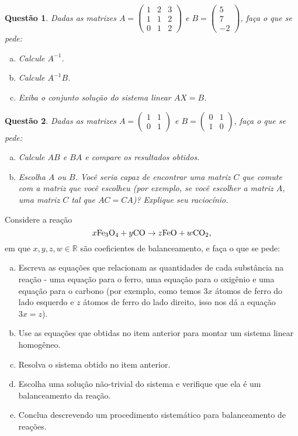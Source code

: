 \documentclass[a4paper,10pt]{article}
\def\R{\mathbb R}
\newtheorem{qst}{Questão}
\begin{document}
\begin{qst}
	Dadas as matrizes $A=\begin{pmatrix}
	1&2&3\\1&1&2\\0&1&2
	\end{pmatrix}$ e $B=\begin{pmatrix}
	5\\7\\-2
	\end{pmatrix}$, faça o que se pede:
	\begin{enumerate}[a)]
		\item Calcule $A^{-1}$.
		\item Calcule $A^{-1}B$.
		\item Exiba o conjunto solução do sistema linear $AX=B$.
	\end{enumerate}
\end{qst}

\begin{qst}
	Dadas as matrizes $A=\begin{pmatrix}
	1&1\\0&1
	\end{pmatrix}$ e $B=\begin{pmatrix}
	0&1\\1&0
	\end{pmatrix}$, faça o que se pede:
	
	\begin{enumerate}[a)]
		\item Calcule $AB$ e $BA$ e compare os resultados obtidos.
		\item Escolha $A$ ou $B$. Você seria capaz de encontrar uma matriz $C$ que comute com a matriz que você escolheu (por exemplo, se você escolher a matriz $A$, uma matriz $C$ tal que $AC=CA$)? Explique seu raciocínio.
	\end{enumerate}
\end{qst}

\begin{bonus}
	Considere a reação
	\[x{\rm Fe_3O_4}+y{\rm CO}\rightarrow z{\rm FeO}+w{\rm CO_2},\]em que $x,y,z,w\in \R$ são coeficientes de balanceamento, e faça o que se pede:
	\begin{enumerate}[a)]
		\item Escreva as equações que relacionam as quantidades de cada substância na reação - uma equação para o ferro, uma equação para o oxigênio e uma equação para o carbono (por exemplo, como temos $3x$ átomos de ferro do lado esquerdo e $z$ átomos de ferro do lado direito, isso nos dá a equação $3x=z$).
		\item Use as equações que obtidas no item anterior para montar um sistema linear homogêneo.
		\item Resolva o sistema obtido no item anterior.
		\item Escolha uma solução não-trivial do sistema e verifique que ela é um balanceamento da reação.
		\item Conclua descrevendo um procedimento sistemático para balanceamento de reações.
	\end{enumerate}
\end{bonus}
\end{document}
